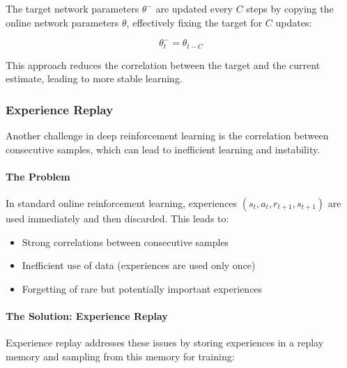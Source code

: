\documentclass[11pt]{article}
\begin{document}
The target network parameters $\theta^-$ are updated every $C$ steps by copying the online network parameters $\theta$, effectively fixing the target for $C$ updates:

\begin{equation}
    \theta^-_t = \theta_{t-C}
\end{equation}

This approach reduces the correlation between the target and the current estimate, leading to more stable learning.

\subsubsection{Experience Replay}

Another challenge in deep reinforcement learning is the correlation between consecutive samples, which can lead to inefficient learning and instability.

\paragraph{The Problem}
In standard online reinforcement learning, experiences $(s_t, a_t, r_{t+1}, s_{t+1})$ are used immediately and then discarded. This leads to:
\begin{itemize}
    \item Strong correlations between consecutive samples
    \item Inefficient use of data (experiences are used only once)
    \item Forgetting of rare but potentially important experiences
\end{itemize}

\paragraph{The Solution: Experience Replay}
Experience replay addresses these issues by storing experiences in a replay memory and sampling from this memory for training:
\end{document}
